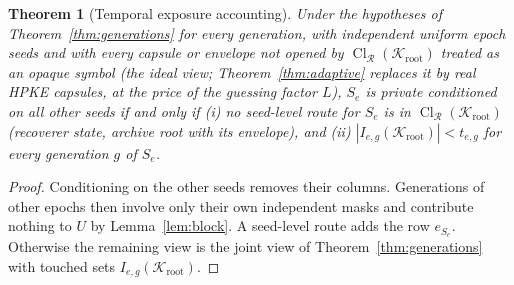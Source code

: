 \documentclass[pdflatex,sn-mathphys-num,twocolumn]{sn-jnl}
\theoremstyle{plain}
\newtheorem{theorem}{Theorem}
\theoremstyle{definition}
\newcommand{\Cl}{\operatorname{Cl}}
\begin{document}
\begin{theorem}[Temporal exposure accounting]\label{thm:temporal}
Under the hypotheses of Theorem~\ref{thm:generations} for every generation, with independent uniform epoch seeds and with every capsule or envelope not opened by $\Cl_{\mathcal R}(\mathcal K_{\mathrm{root}})$ treated as an opaque symbol (the ideal view; Theorem~\ref{thm:adaptive} replaces it by real HPKE capsules, at the price of the guessing factor $L$), $S_e$ is private conditioned on all other seeds if and only if (i) no seed-level route for $S_e$ is in $\Cl_{\mathcal R}(\mathcal K_{\mathrm{root}})$ (recoverer state, archive root with its envelope), and (ii) $|I_{e,g}(\mathcal K_{\mathrm{root}})|<t_{e,g}$ for every generation $g$ of $S_e$.
\end{theorem}
\begin{proof}
Conditioning on the other seeds removes their columns. Generations of other epochs then involve only their own independent masks and contribute nothing to $U$ by Lemma~\ref{lem:block}. A seed-level route adds the row $e_{S_e}$. Otherwise the remaining view is the joint view of Theorem~\ref{thm:generations} with touched sets $I_{e,g}(\mathcal K_{\mathrm{root}})$.
\end{proof}
\end{document}
